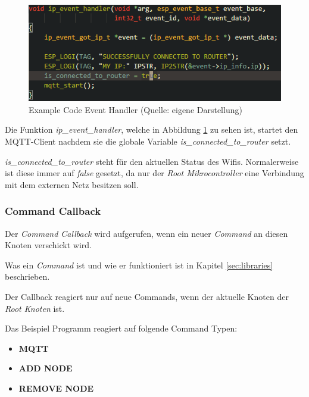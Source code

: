 \begin{figure}[H]
    \begin{center}
        \includegraphics[scale=0.8]{images/example_code_event_handler.png}
        \caption{Example Code Event Handler (Quelle: eigene Darstellung)}
        \label{abb:example_code_event_handler}
    \end{center}
\end{figure}

Die Funktion \textit{ip\_event\_handler}, welche in Abbildung \ref{abb:example_code_event_handler} zu sehen ist, startet den MQTT-Client nachdem sie die globale Variable \textit{is\_connected\_to\_router} setzt.

\textit{is\_connected\_to\_router} steht für den aktuellen Status des Wifis. Normalerweise ist diese immer auf \textit{false} gesetzt, da nur der \textit{Root Mikrocontroller} eine Verbindung mit dem externen Netz besitzen soll.

\subsubsection{Command Callback}

Der \textit{Command Callback} wird aufgerufen, wenn ein neuer \textit{Command} an diesen Knoten verschickt wird.

Was ein \textit{Command} ist und wie er funktioniert ist in Kapitel \ref{sec:libraries} beschrieben.

Der Callback reagiert nur auf neue Commands, wenn der aktuelle Knoten der \textit{Root Knoten} ist.

Das Beispiel Programm reagiert auf folgende Command Typen:

\begin{itemize}
    \item \textbf{MQTT}
    \item \textbf{ADD NODE}
    \item \textbf{REMOVE NODE}
\end{itemize}

